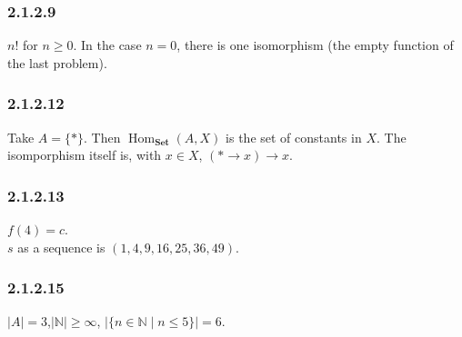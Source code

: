 \documentclass{article}
\DeclareMathOperator{\Hom}{Hom}
\begin{document}
\subsubsection*{2.1.2.9}
$n!$ for $n \ge 0$. In the case $n = 0$, there is one isomorphism (the
empty function of the last problem).

\subsubsection*{2.1.2.12}
Take $A = \{*\}$. Then $\Hom_{\boldsymbol{Set}}\left(A, X \right)$ is
the set of constants in $X$.  The isomporphism itself is, with $x \in
X$, $(* \to x) \to x$.

\clearpage

\subsubsection*{2.1.2.13}
$f(4) = c$.\\
$s$ as a sequence is $\left(1, 4, 9, 16, 25, 36, 49\right)$.

\subsubsection*{2.1.2.15}
$\lvert A \rvert = 3$,$\lvert \mathbb{N} \rvert \ge \infty $, $\lvert
\{n \in \mathbb{N}\;|\; n \le 5\}\rvert = 6$.
\end{document}
